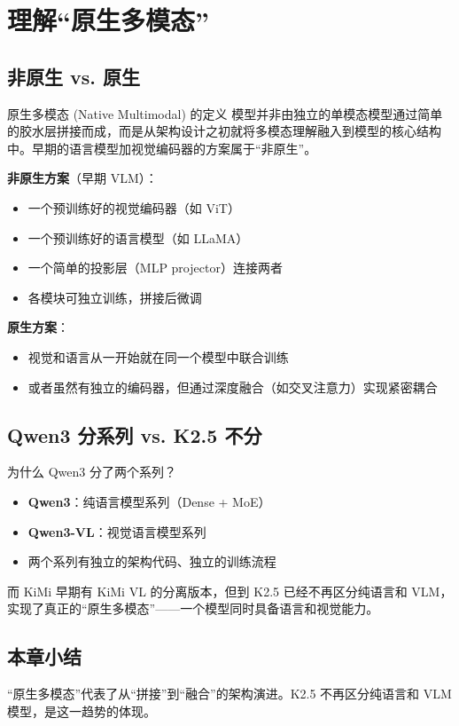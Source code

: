 \section{理解``原生多模态''}

\subsection{非原生 vs. 原生}

\begin{importantbox}{原生多模态 (Native Multimodal) 的定义}
模型并非由独立的单模态模型通过简单的胶水层拼接而成，而是从架构设计之初就将多模态理解融入到模型的核心结构中。早期的语言模型加视觉编码器的方案属于``非原生''。
\end{importantbox}

\textbf{非原生方案}（早期 VLM）：
\begin{itemize}
  \item 一个预训练好的视觉编码器（如 ViT）
  \item 一个预训练好的语言模型（如 LLaMA）
  \item 一个简单的投影层（MLP projector）连接两者
  \item 各模块可独立训练，拼接后微调
\end{itemize}

\textbf{原生方案}：
\begin{itemize}
  \item 视觉和语言从一开始就在同一个模型中联合训练
  \item 或者虽然有独立的编码器，但通过深度融合（如交叉注意力）实现紧密耦合
\end{itemize}

\subsection{Qwen3 分系列 vs. K2.5 不分}

\begin{knowledgebox}{为什么 Qwen3 分了两个系列？}
\begin{itemize}
  \item \textbf{Qwen3}：纯语言模型系列（Dense + MoE）
  \item \textbf{Qwen3-VL}：视觉语言模型系列
  \item 两个系列有独立的架构代码、独立的训练流程
\end{itemize}
而 KiMi 早期有 KiMi VL 的分离版本，但到 K2.5 已经不再区分纯语言和 VLM，实现了真正的``原生多模态''——一个模型同时具备语言和视觉能力。
\end{knowledgebox}

\subsection{本章小结}

``原生多模态''代表了从``拼接''到``融合''的架构演进。K2.5 不再区分纯语言和 VLM 模型，是这一趋势的体现。

